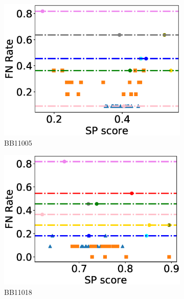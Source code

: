 \begin{figure}[!htbp]
\begin{adjustwidth}{-1cm}{-1cm}
\begin{subfigure}{0.26\textwidth}
			\includegraphics[width=\columnwidth]{Figure/summary/precomputedInit/Balibase/BB11005_fnrate_vs_sp_2}
			\caption{BB11005}
\end{subfigure}    
		\begin{subfigure}{0.26\textwidth}
			\includegraphics[width=\columnwidth]{Figure/summary/precomputedInit/Balibase/BB11018_fnrate_vs_sp_2}
			\caption{BB11018}
\end{subfigure}
		\begin{subfigure}{0.26\textwidth}

\end{subfigure}
\end{adjustwidth}
\end{figure}
